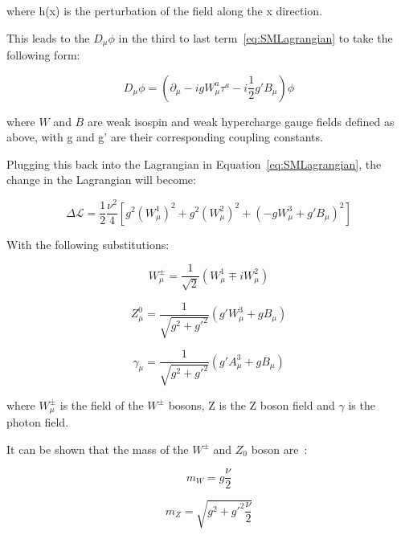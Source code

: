 where h(x) is the perturbation of the field along the x direction.

This leads to the $D_{\mu} \phi$ in the third to last term~\ref{eq:SMLagrangian} to take the following form:

\begin{equation}
    D_{\mu} \phi = (\partial_{\mu} - ig W_{\mu}^{a}\tau^{a} - i\frac{1}{2}g'B_{\mu}) \phi
\end{equation}

where $W$ and $B$ are weak isospin and weak hypercharge gauge fields defined as above, with g and g' are their corresponding coupling constants. %

Plugging this back into the Lagrangian in Equation~\ref{eq:SMLagrangian}, the change in the Lagrangian will become:

\begin{equation}
    \Delta \mathcal{L} = \frac{1}{2} \frac{\nu^{2}}{4}[g^{2}(W^{1}_{\mu})^2 + g^{2}(W_{\mu}^{2})^{2} + (-g W_{\mu}^{3}+ g'B_{\mu})^2]
\end{equation}

With the following substitutions:

\begin{equation}
    W^{\pm}_{\mu} = \frac{1}{\sqrt{2}}(W_{\mu}^{1} \mp iW^{2}_{\mu}) 
\end{equation}

\begin{equation}
    Z^{0}_{\mu}=\frac{1}{\sqrt{g^{2}+g'^{2}}}(g'W_{\mu}^{3} + gB_{\mu})
\end{equation}

\begin{equation}
    \gamma_{\mu} = \frac{1}{\sqrt{g^{2}+g'^{2}}}(g'A^{3}_{\mu} + g B_{\mu})
\end{equation}

where $W^{\pm}_{\mu}$ is the field of the $W^{\pm}$ bosons, Z is the Z boson field and $\gamma$ is the photon field. 

It can be shown that the mass of the $W^{\pm}$ and $Z_{0}$ boson are~\cite{peskin2018introduction}:

\begin{equation}
    m_{W} = g \frac{\nu}{2}
\end{equation}

\begin{equation}
    m_{Z} = \sqrt{g^{2}+ g'^{2}\frac{\nu}{2}}
\end{equation}

